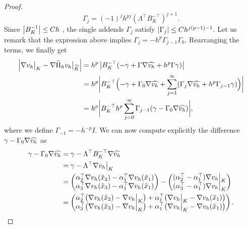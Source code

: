 \documentclass[10pt]{article}
\begin{document}
\begin{proof}
	\begin{equation}
		\Gamma_j = (-1)^j h^{pj} (\Lambda^\top B_K^{-\top})^{j+1}.
	\end{equation} 
	Since $\left\lvert B_K^{-1}\right\rvert \leq Ch$ \cite[Theorem 3.1.3]{Cia02}, the single addends $\Gamma_j$ satisfy $\left\lvert\Gamma_j\right\rvert \leq Ch^{j(p-1)-1}$. Let us remark that the expression above implies $\Gamma_j = -h^p \Gamma_{j-1} \Gamma_0$. Rearranging the terms, we finally get
	\begin{equation}
	\begin{aligned}
		\left\lvert\nabla v_h\bigr\rvert_{K} - \nabla \widetilde \Pi_h v_h \bigr\rvert_{\widetilde K}\right\rvert &= h^p \left\lvert B_K^{-\top}(-\gamma + \Gamma \nabla \widehat{v_h} + h^p \Gamma \gamma)\right\rvert \\
		&= h^p \bigg\lvert B_K^{-\top} \Bigl(-\gamma + \Gamma_0 \nabla \widehat{v_h} + \sum_{j=1}^\infty (\Gamma_j\nabla \widehat{v_h} + h^p \Gamma_{j-1} \gamma)\Bigr)\bigg\rvert \\
		&= h^p \bigg\lvert B_K^{-\top} h^p \sum_{j=0}^\infty \Gamma_{j-1} (\gamma -\Gamma_0\nabla \widehat{v_h})\bigg\rvert,
	\end{aligned}
	\end{equation}
	where we define $\Gamma_{-1} = -h^{-p}I$. We can now compute explicitly the difference $\gamma - \Gamma_0 \nabla \widehat{v_h}$ as
	\begin{equation}
	\begin{aligned}
		\gamma - \Gamma_0 \nabla \bhat{v_h} &= \gamma - \Lambda^\top B_K^{-\top} \nabla \bhat{v_h}\\
		&= \gamma - \Lambda^\top \nabla v_h \eval{K} \\
		&= \begin{pmatrix} \alpha_2^\top \nabla v_h(\tilde x_2) - \alpha_1^\top \nabla v_h(\tilde x_1) \\
		\alpha_3^\top \nabla v_h(\tilde x_3) - \alpha_1^\top \nabla v_h(\tilde x_1) \end{pmatrix}
		- \begin{pmatrix} (\alpha_2^\top - \alpha_1^\top) \nabla v_h \eval{K} \\ (\alpha_3^\top - \alpha_1^\top) \nabla v_h \eval{K}	\end{pmatrix}\\
		&= \begin{pmatrix} \alpha_2^\top \big(\nabla v_h(\tilde x_2) - \nabla v_h \eval{K}\big) + \alpha_1^\top \big(\nabla v_h \eval{K} - \nabla v_h(\tilde x_1)\big) \\
						   \alpha_3^\top \big(\nabla v_h(\tilde x_3) - \nabla v_h \eval{K}\big) + \alpha_1^\top \big(\nabla v_h \eval{K} - \nabla v_h(\tilde x_1)\big) \end{pmatrix}.                

\end{aligned}
\end{equation}
\end{proof}
\end{document}
